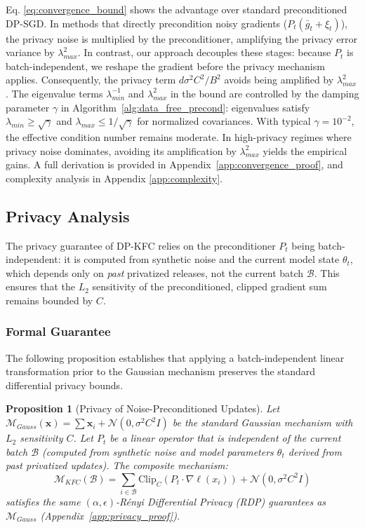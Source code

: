 \documentclass{article}
\theoremstyle{plain}
\newtheorem{proposition}[theorem]{Proposition}
\theoremstyle{definition}
\theoremstyle{remark}
\begin{document}
Eq. \eqref{eq:convergence_bound} shows the advantage over standard preconditioned DP-SGD. In methods that directly precondition noisy gradients ($P_t(\bar{g}_t + \xi_t)$), the privacy noise is multiplied by the preconditioner, amplifying the privacy error variance by $\lambda_{max}^2$. In contrast, our approach decouples these stages: because $P_t$ is batch-independent, we reshape the gradient before the privacy mechanism applies. Consequently, the privacy term $d \sigma^2 C^2 / B^2$ avoids being amplified by $\lambda_{max}^2$. The eigenvalue terms $\lambda_{min}^{-1}$ and $\lambda_{max}^2$ in the bound are controlled by the damping parameter $\gamma$ in Algorithm~\ref{alg:data_free_precond}: eigenvalues satisfy $\lambda_{min} \geq \sqrt{\gamma}$ and $\lambda_{max} \leq 1/\sqrt{\gamma}$ for normalized covariances. With typical $\gamma = 10^{-2}$, the effective condition number remains moderate. In high-privacy regimes where privacy noise dominates, avoiding its amplification by $\lambda_{max}^2$ yields the empirical gains. A full derivation is provided in Appendix~\ref{app:convergence_proof}, and complexity analysis in Appendix \ref{app:complexity}.

\subsection{Privacy Analysis}
\label{subsec:privacy_analysis}

The privacy guarantee of DP-KFC relies on the preconditioner $P_t$ being batch-independent: it is computed from synthetic noise and the current model state $\theta_t$, which depends only on \textit{past} privatized releases, not the current batch $\mathcal{B}$. This ensures that the $L_2$ sensitivity of the preconditioned, clipped gradient sum remains bounded by $C$.

\subsubsection{Formal Guarantee}
The following proposition establishes that applying a batch-independent linear transformation prior to the Gaussian mechanism preserves the standard differential privacy bounds.

\begin{proposition}[Privacy of Noise-Preconditioned Updates]
\label{thm:sensitivity}
Let $\mathcal{M}_{Gauss}(\mathbf{x}) = \sum \mathbf{x}_i + \mathcal{N}(0, \sigma^2 C^2 I)$ be the standard Gaussian mechanism with $L_2$ sensitivity $C$. Let $P_t$ be a linear operator that is independent of the current batch $\mathcal{B}$ (computed from synthetic noise and model parameters $\theta_t$ derived from past privatized updates). The composite mechanism:
\begin{equation}
    \mathcal{M}_{KFC}(\mathcal{B}) = \sum_{i \in \mathcal{B}} \text{Clip}_C(P_t \cdot \nabla \ell(x_i)) + \mathcal{N}(0, \sigma^2 C^2 I)
\end{equation}
satisfies the same $(\alpha, \epsilon)$-Rényi Differential Privacy (RDP) \cite{Mironov_2017} guarantees as $\mathcal{M}_{Gauss}$ (Appendix~\ref{app:privacy_proof}).
\end{proposition}
\end{document}
